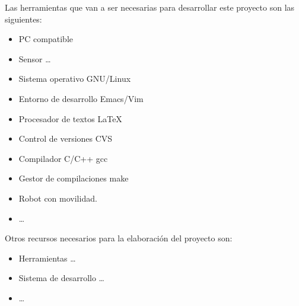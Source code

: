 \documentclass[11pt,a4paper,oneside]{article}
\newcommand{\myreferencespath}{../}
\begin{document}
Las herramientas que van a ser necesarias para desarrollar este proyecto
son las siguientes:

\begin{itemize}
\item PC compatible
\item Sensor  \ldots
\item Sistema operativo GNU/Linux~\cite{gnulinux}
\item Entorno de desarrollo Emacs/Vim~\cite{emacs}
\item Procesador de textos \LaTeX~\cite{lamport94}
\item Control de versiones CVS~\cite{cvs}
\item Compilador C/C++ gcc~\cite{gcc}
\item Gestor de compilaciones make~\cite{make}
\item Robot con movilidad.
\item  \ldots
\end{itemize}

Otros recursos necesarios para la elaboración del proyecto son:

\begin{itemize}
\item Herramientas  \ldots
\item Sistema de desarrollo  \ldots
\item  \ldots
\end{itemize}






\makeatletter{}


\newcommand{\mybibfileOne}{biblio/biblio}
\newcommand{\mybibfileTwo}{biblio/biblio2}

\newcommand{\mybibfiles}{\myreferencespath\mybibfileOne}






                
\end{document}
